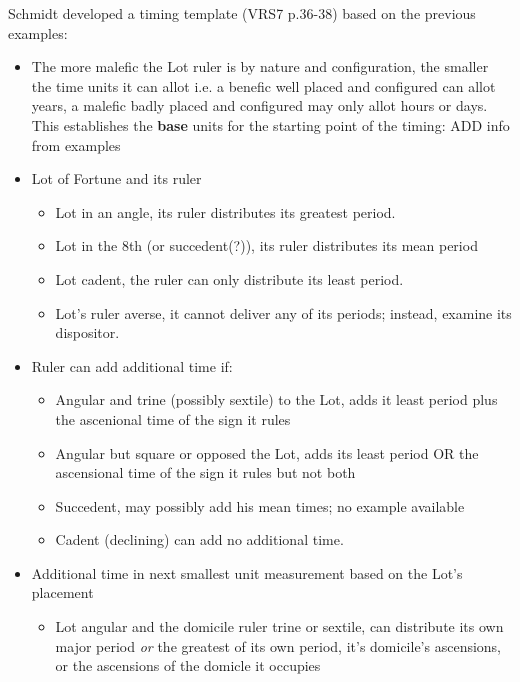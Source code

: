\begin{mdframed}[backgroundcolor=cyan!05]
\tiny
Schmidt developed a timing template (VRS7 p.36-38) based on the previous examples:

\begin{itemize}[itemsep=1pt, topsep=1pt, partopsep=0pt]
\item The more malefic the Lot ruler is by nature and configuration, the smaller the time units it can allot i.e. a benefic well placed and configured can allot years, a malefic badly placed and configured may only allot hours or days. This establishes the \textbf{base} units for the starting point of the timing: {\color{red} ADD info from examples}
\item Lot of Fortune  and its ruler
\begin{itemize}[itemsep=1pt, topsep=1pt, partopsep=0pt]
\item Lot in an angle, its ruler distributes its greatest period.
\item Lot in the 8th (or succedent(?)), its ruler distributes its mean period
\item Lot cadent, the ruler can only distribute its least period.
\item Lot's ruler averse, it cannot deliver any of its periods; instead, examine its dispositor.
\end{itemize}
\item Ruler can add additional time if:
\begin{itemize}[itemsep=1pt, topsep=1pt, partopsep=0pt]
\item Angular and trine (possibly sextile) to the Lot, adds it least period plus the ascenional time of the sign it rules
\item Angular but square or opposed the Lot, adds its least period OR the ascensional time of the sign it rules but not both
\item Succedent, may possibly add his mean times; no example available
\item Cadent (declining) can add no additional time.
\end{itemize}
\item Additional time in next smallest unit measurement based on the Lot's placement
\begin{itemize}[itemsep=1pt, topsep=1pt, partopsep=0pt]
\item Lot angular and the domicile ruler trine or sextile, can distribute its own major period \textsl{or} the greatest of its own period, it's domicile's ascensions, or the ascensions of the domicle it occupies

\end{itemize}
\end{itemize}
\end{mdframed}
